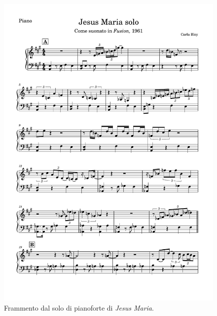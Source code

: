  \begin{figure}[h]
 	\centering
 	\includegraphics[clip,trim=1cm 13cm 1cm 2cm, width=\textwidth,page=2]{jesus solo-Piano}
 	\caption{Frammento dal solo di pianoforte di \textit{Jesus Maria}.}
 	\label{fig:gesummaria}
 \end{figure} 
